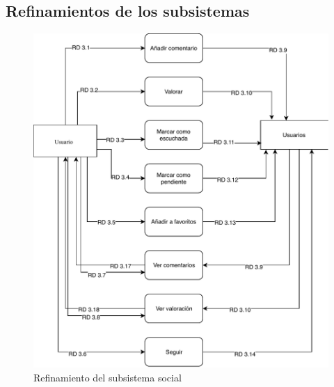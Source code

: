 \subsection{Refinamientos de los subsistemas}

\begin{figure}[H]
  \caption{Refinamiento del subsistema social}
  \centering
  \includegraphics{diagramas/ref-social.pdf}
\end{figure}

